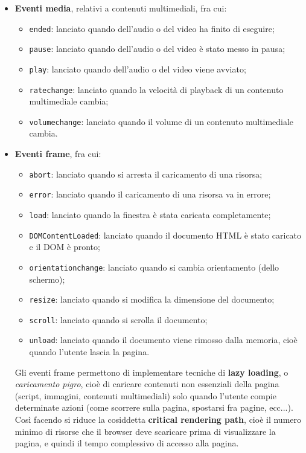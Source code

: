 \documentclass[a4paper,11pt]{article}
\begin{document}
\begin{itemize}
	\item \textbf{Eventi media}, relativi a contenuti multimediali, fra cui:
		\begin{itemize}
			\item \lstinline|ended|: lanciato quando dell'audio o del video ha finito di eseguire;
			\item \lstinline|pause|: lanciato quando dell'audio o del video è stato messo in pausa;
			\item \lstinline|play|: lanciato quando dell'audio o del video viene avviato;
			\item \lstinline|ratechange|: lanciato quando la velocità di playback di un contenuto multimediale cambia;
			\item \lstinline|volumechange|: lanciato quando il volume di un contenuto multimediale cambia.
		\end{itemize}
	\item \textbf{Eventi frame}, fra cui:
		\begin{itemize}
			\item \lstinline|abort|: lanciato quando si arresta il caricamento di una risorsa;
			\item \lstinline|error|: lanciato quando il caricamento di una risorsa va in errore;
			\item \lstinline|load|: lanciato quando la finestra è stata caricata completamente;
			\item \lstinline|DOMContentLoaded|: lanciato quando il documento HTML è stato caricato e il DOM è pronto;
			\item \lstinline|orientationchange|: lanciato quando si cambia orientamento (dello schermo);
			\item \lstinline|resize|: lanciato quando si modifica la dimensione del documento;
			\item \lstinline|scroll|: lanciato quando si scrolla il documento;
			\item \lstinline|unload|: lanciato quando il documento viene rimosso dalla memoria, cioè quando l'utente lascia la pagina. 
		\end{itemize}
		Gli eventi frame permettono di implementare tecniche di \textbf{lazy loading}, o \textit{caricamento pigro}, cioè di caricare contenuti non essenziali della pagina (script, immagini, contenuti multimediali) solo quando l'utente compie determinate azioni (come scorrere sulla pagina, spostarsi fra pagine, ecc...).
		Così facendo si riduce la cosiddetta \textbf{critical rendering path}, cioè il numero minimo di risorse che il browser deve scaricare prima di visualizzare la pagina, e quindi il tempo complessivo di accesso alla pagina. 
\end{itemize}
\end{document}
